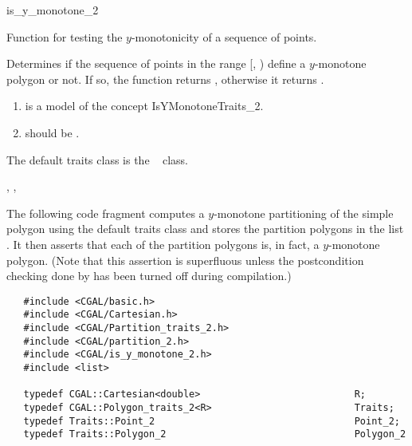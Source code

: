 \begin{ccRefFunction}{is_y_monotone_2}

\ccDefinition

Function for testing the $y$-monotonicity of a sequence of points.


{
Determines if the sequence of points in the range 
[, ) define a $y$-monotone 
polygon or not. If so, the function returns , otherwise it
returns . 
}

\begin{enumerate}
    \item {} is a model of the concept IsYMonotoneTraits\_2.%
    \item {} should be .
\end{enumerate}

The default traits class  is the \cgal\ 
class. 

\ccSeeAlso
{},
,

\ccExample

The following code fragment computes a $y$-monotone partitioning
of the simple polygon  using the default
traits class and stores the partition polygons in the list 
.  It then asserts that each of the partition 
polygons is, in fact, a $y$-monotone polygon.  (Note that this
assertion is superfluous unless the postcondition checking done
by  has been turned off during compilation.)

\begin{verbatim}
   #include <CGAL/basic.h>
   #include <CGAL/Cartesian.h>
   #include <CGAL/Partition_traits_2.h>
   #include <CGAL/partition_2.h>
   #include <CGAL/is_y_monotone_2.h>
   #include <list>

   typedef CGAL::Cartesian<double>                           R;
   typedef CGAL::Polygon_traits_2<R>                         Traits;
   typedef Traits::Point_2                                   Point_2;
   typedef Traits::Polygon_2                                 Polygon_2


\end{verbatim}
\end{ccRefFunction}
